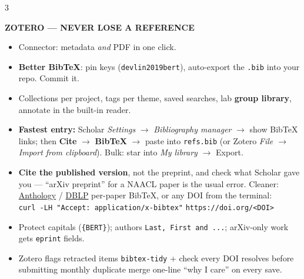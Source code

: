 \documentclass[10pt,a4paper]{article}
\newcommand{\head}[1]{%
  \vspace{4.5pt}{\color{brand}\rule{\linewidth}{0.9pt}}\par\vspace{1.5pt}%
  {\bfseries\color{brand}\MakeUppercase{#1}}\par\vspace{2pt}}
\newcommand{\code}[1]{\texttt{#1}}
\newcommand{\lnk}[2]{\href{#1}{\color{brandlight}#2}}
\newcommand{\dt}{\,\textperiodcentered\,\allowbreak}
\begin{document}
\begin{multicols}{3}
\head{Zotero --- never lose a reference}
\begin{itemize}
  \item Connector: metadata \emph{and} PDF in one click.
  \item \textbf{Better BibTeX}: pin keys (\code{devlin2019bert}), auto-export
        the \code{.bib} into your repo. Commit it.
  \item Collections per project, tags per theme, saved searches, lab
        \textbf{group library}, annotate in the built-in reader.
  \item \textbf{Fastest entry:} Scholar \emph{Settings} $\to$
        \emph{Bibliography manager} $\to$ show BibTeX links; then
        \textbf{Cite} $\to$ \textbf{BibTeX} $\to$ paste into \code{refs.bib}
        (or Zotero \emph{File $\to$ Import from clipboard}). Bulk: star into
        \emph{My library} $\to$ Export.
  \item \textbf{Cite the published version}, not the preprint, and check what
        Scholar gave you --- ``arXiv preprint'' for a NAACL paper is the usual
        error. Cleaner: \lnk{https://aclanthology.org}{Anthology} /
        \lnk{https://dblp.org}{DBLP} per-paper BibTeX, or any DOI from the
        terminal:\\ \code{curl -LH "Accept: application/x-bibtex"}
        \code{https://doi.org/<DOI>}
  \item Protect capitals (\code{\{BERT\}}); authors \code{Last, First and
        ...}; arXiv-only work gets \code{eprint} fields.
  \item Zotero flags retracted items\dt \code{bibtex-tidy} + check every DOI
        resolves before submitting\dt monthly duplicate merge\dt one-line
        ``why I care'' on every save.
\end{itemize}


\end{multicols}
\end{document}
